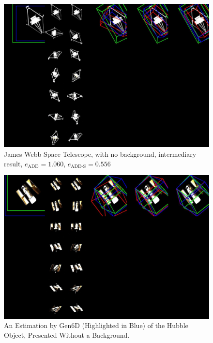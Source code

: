 \begin{figure}[ht]
  \centering
  \includegraphics[width=\textwidth]{data/fig16.jpg}
  \caption{James Webb Space Telescope, with no background, intermediary result, $e_\mathrm{ADD}=1.060$, $e_{\mathrm{ADD}\text{-}\mathrm{S}}=0.556$}
  \label{fig:cap1}
\end{figure}

\begin{figure}[ht]
  \centering
  \includegraphics[width=\textwidth]{data/res2.jpg}
  \caption{An Estimation by Gen6D (Highlighted in Blue) of the Hubble Object, Presented Without a Background.} 
  \label{fig:cap1}
\end{figure}


